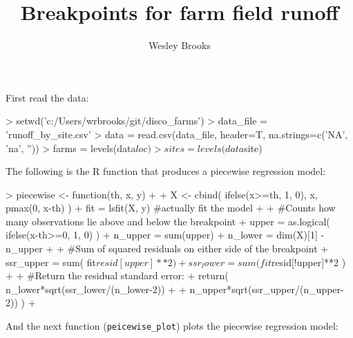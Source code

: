 \documentclass[12pt]{article}
\title{Breakpoints for farm field runoff}
\author{Wesley Brooks}
\date{}                                           %
\begin{document}
\maketitle

First read the data:
\vspace{3mm}

\begin{Schunk}
\begin{Sinput}
> setwd('c:/Users/wrbrooks/git/disco_farms')
> data_file = 'runoff_by_site.csv'
> data = read.csv(data_file, header=T, na.strings=c('NA', 'na', ''))
> farms = levels(data$loc)
> sites = levels(data$site)
\end{Sinput}
\end{Schunk}

\vspace{5mm}

The following is the R function that produces a piecewise regression model:

\begin{Schunk}
\begin{Sinput}
> piecewise <- function(th, x, y)
+ { 
+     X <- cbind( ifelse(x>=th, 1, 0), x, pmax(0, x-th) )
+     fit = lsfit(X, y) #actually fit the model
+     
+     #Counts how many observations lie above and below the breakpoint
+     upper = as.logical( ifelse(x-th>=0, 1, 0) )
+     n_upper = sum(upper)
+     n_lower = dim(X)[1] - n_upper
+     
+     #Sum of squared residuals on either side of the breakpoint
+     ssr_upper = sum( fit$resid[upper]**2 )
+     ssr_lower = sum( fit$resid[!upper]**2 )
+     
+     #Return the residual standard error:
+     return( n_lower*sqrt(ssr_lower/(n_lower-2)) 
+         + n_upper*sqrt(ssr_upper/(n_upper-2)) )
+ }
\end{Sinput}
\end{Schunk}

\newpage

And the next function (\verb+peicewise_plot+) plots the piecewise regression model:
\end{document}
